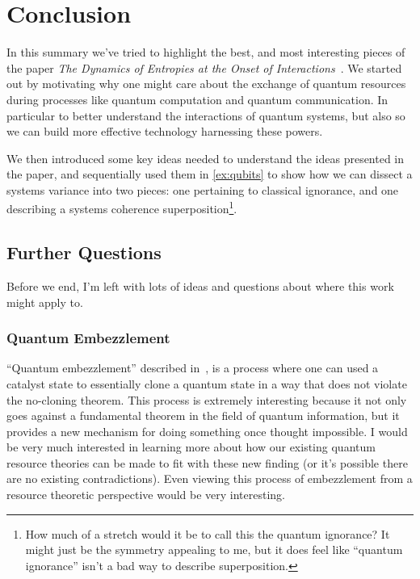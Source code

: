 \documentclass[11pt]{article}
\theoremstyle{definition}
\begin{document}
\section{Conclusion}

In this summary we've tried to highlight the best, and most interesting pieces of the paper \emph{The Dynamics of Entropies at the Onset of Interactions}~\cite{dynamic-entropies}. We started out by motivating why one might care about the exchange of quantum resources during processes like quantum computation and quantum communication. In particular to better understand the interactions of quantum systems, but also so we can build more effective technology harnessing these powers.

We then introduced some key ideas needed to understand the ideas presented in the paper, and sequentially used them in \cref{ex:qubits} to show how we can dissect a systems variance into two pieces: one pertaining to classical ignorance, and one describing a systems coherence superposition\footnote{How much of a stretch would it be to call this the quantum ignorance? It might just be the symmetry appealing to me, but it does feel like ``quantum ignorance'' isn't a bad way to describe superposition.}.



\subsection{Further Questions}

Before we end, I'm left with lots of ideas and questions about where this work might apply to.

\subsubsection{Quantum Embezzlement}
``Quantum embezzlement'' described in~\cite{embezzlement,self-embezzlement}, is a process where one can used a catalyst state to essentially clone a quantum state in a way that does not violate the no-cloning theorem. This process is extremely interesting because it not only goes against a fundamental theorem in the field of quantum information, but it provides a new mechanism for doing something once thought impossible. I would be very much interested in learning more about how our existing quantum resource theories can be made to fit with these new finding (or it's possible there are no existing contradictions). Even viewing this process of embezzlement from a resource theoretic perspective would be very interesting.
\end{document}
